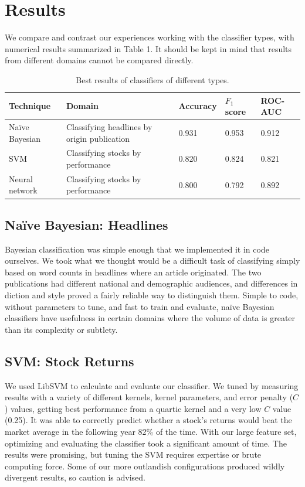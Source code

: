 \documentclass[format=acmlarge]{acmart}
\begin{document}
\section{Results}
We compare and contrast our experiences working with the classifier types, with numerical results summarized in Table 1.  It should be kept in mind that results from different domains cannot be compared directly.

\begin{table}
  \caption{Best results of classifiers of different types.}
  \label{tab:one}
  \begin{tabular}{lllll}
    Technique & Domain & Accuracy & $F_1$ score & ROC-AUC\\
    \hline
    Na\"{i}ve Bayesian & Classifying headlines by origin publication & 0.931 & 0.953 & 0.912\\
    SVM & Classifying stocks by performance & 0.820 & 0.824 & 0.821\\
    Neural network & Classifying stocks by performance & 0.800 & 0.792 & 0.892\\
  \end{tabular}
\end{table}

\subsection{Na\"{i}ve Bayesian: Headlines}
Bayesian classification was simple enough that we implemented it in code ourselves.  We took what we thought would be a difficult task of classifying simply based on word counts in headlines where an article originated.  The two publications had different national and demographic audiences, and differences in diction and style proved a fairly reliable way to distinguish them.  Simple to code, without parameters to tune, and fast to train and evaluate, na\"{i}ve Bayesian classifiers have usefulness in certain domains where the volume of data is greater than its complexity or subtlety.

\subsection{SVM: Stock Returns}
We used LibSVM to calculate and evaluate our classifier.  We tuned by measuring results with a variety of different kernels, kernel parameters, and error penalty ($C$) values, getting best performance from a quartic kernel and a very low $C$ value (0.25).  It was able to correctly predict whether a stock's returns would beat the market average in the following year 82\% of the time.  With our large feature set, optimizing and evaluating the classifier took a significant amount of time.  The results were promising, but tuning the SVM requires expertise or brute computing force.  Some of our more outlandish configurations produced wildly divergent results, so caution is advised.
\end{document}
